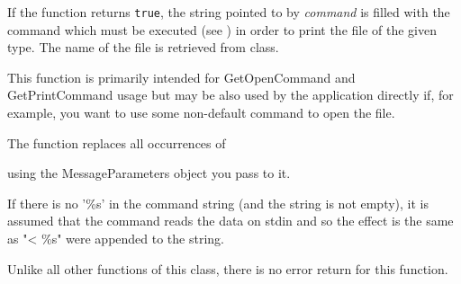 If the function returns {\tt true}, the string pointed to by {\it command} is filled
with the command which must be executed (see ) in
order to print the file of the given type. The name of the file is
retrieved from  class.

\label{wxfiletypeexpandcommand}


This function is primarily intended for GetOpenCommand and GetPrintCommand
usage but may be also used by the application directly if, for example, you want
to use some non-default command to open the file.

The function replaces all occurrences of

\twocolwidtha{7cm}
\begin{twocollist}\itemsep=0pt
\end{twocollist}

using the MessageParameters object you pass to it.

If there is no '\%s' in the command string (and the string is not empty), it is
assumed that the command reads the data on stdin and so the effect is the same
as "< \%s" were appended to the string.

Unlike all other functions of this class, there is no error return for this
function.

